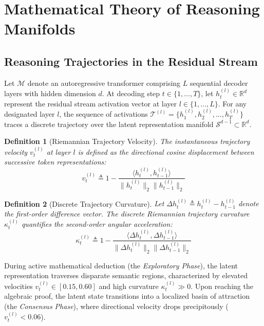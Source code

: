 \documentclass[10pt,twocolumn]{article}
\newtheorem{definition}{Definition}
\begin{document}
\section{Mathematical Theory of Reasoning Manifolds}
\label{sec:theory}

\subsection{Reasoning Trajectories in the Residual Stream}
Let $\mathcal{M}$ denote an autoregressive transformer comprising $L$ sequential decoder layers with hidden dimension $d$. At decoding step $t \in \{1, \dots, T\}$, let $h_t^{(l)} \in \mathbb{R}^d$ represent the residual stream activation vector at layer $l \in \{1, \dots, L\}$. For any designated layer $l$, the sequence of activations $\mathcal{T}^{(l)} = \{h_1^{(l)}, h_2^{(l)}, \dots, h_T^{(l)}\}$ traces a discrete trajectory over the latent representation manifold $\mathcal{S}^{d-1} \subset \mathbb{R}^d$.

\begin{definition}[Riemannian Trajectory Velocity]
\label{def:velocity}
The instantaneous trajectory velocity $v_t^{(l)}$ at layer $l$ is defined as the directional cosine displacement between successive token representations:
\begin{equation}
    v_t^{(l)} \triangleq 1 - \frac{\langle h_t^{(l)}, h_{t-1}^{(l)} \rangle}{\|h_t^{(l)}\|_2 \|h_{t-1}^{(l)}\|_2}
\end{equation}
\end{definition}

\begin{definition}[Discrete Trajectory Curvature]
\label{def:curvature}
Let $\Delta h_t^{(l)} \triangleq h_t^{(l)} - h_{t-1}^{(l)}$ denote the first-order difference vector. The discrete Riemannian trajectory curvature $\kappa_t^{(l)}$ quantifies the second-order angular acceleration:
\begin{equation}
    \kappa_t^{(l)} \triangleq 1 - \frac{\langle \Delta h_t^{(l)}, \Delta h_{t-1}^{(l)} \rangle}{\|\Delta h_t^{(l)}\|_2 \|\Delta h_{t-1}^{(l)}\|_2}
\end{equation}
\end{definition}

During active mathematical deduction (the \emph{Exploratory Phase}), the latent representation traverses disparate semantic regions, characterized by elevated velocities $v_t^{(l)} \in [0.15, 0.60]$ and high curvature $\kappa_t^{(l)} \gg 0$. Upon reaching the algebraic proof, the latent state transitions into a localized basin of attraction (the \emph{Consensus Phase}), where directional velocity drops precipitously ($v_t^{(l)} < 0.06$).
\end{document}
